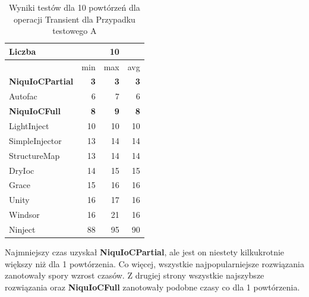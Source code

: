 \documentclass[12pt]{article}
\begin{document}
\begin{table}[H]
\captionsetup{belowskip=0pt,aboveskip=0pt}
\begin{center}
\begin{small}
	\begin{tabular}{ | l | r r r | }
    		\hline
Liczba & & 10 & \\ \hline
 & min & max & avg \\ \hline
\textbf{NiquIoCPartial} & \textbf{3} & \textbf{3} & \textbf{3} \\ \hline
Autofac & 6 & 7 & 6 \\ \hline
\textbf{NiquIoCFull} & \textbf{8} & \textbf{9} & \textbf{8} \\ \hline
LightInject & 10 & 10 & 10 \\ \hline
SimpleInjector & 13 & 14 & 14 \\ \hline
StructureMap & 13 & 14 & 14 \\ \hline
DryIoc & 14 & 15 & 15 \\ \hline
Grace & 15 & 16 & 16 \\ \hline
Unity & 16 & 17 & 16 \\ \hline
Windsor & 16 & 21 & 16 \\ \hline
Ninject & 88 & 95 & 90 \\ \hline
  	\end{tabular}
\end{small}
\end{center}
\caption{Wyniki testów dla 10 powtórzeń dla operacji Transient dla Przypadku testowego A}
\label{TestCaseA_Transient10}
\end{table} 
Najmniejszy czas uzyskał \textbf{NiquIoCPartial}, ale jest on niestety kilkukrotnie większy niż dla 1 powtórzenia. Co więcej, wszystkie najpopularniejsze rozwiązania zanotowały spory wzrost czasów. Z drugiej strony wszystkie najszybsze rozwiązania oraz \textbf{NiquIoCFull} zanotowały podobne czasy co dla 1 powtórzenia.
\\ \\
\end{document}
